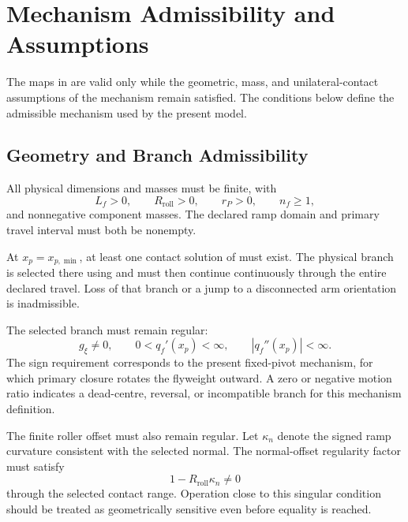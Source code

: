\documentclass[11pt]{report}
\numberwithin{equation}{section}
\newcounter{assump}
\begin{document}
\section{Mechanism Admissibility and Assumptions}
\label{app:flyweight_admissibility}

The maps in  are valid only while the geometric,
mass, and unilateral-contact assumptions of the mechanism remain satisfied.
The conditions below define the admissible mechanism used by the present model.

\subsection{Geometry and Branch Admissibility}

All physical dimensions and masses must be finite, with
\begin{equation}
    L_f>0,
    \qquad
    R_{\mathrm{roll}}>0,
    \qquad
    r_P>0,
    \qquad
    n_f\ge1,
\end{equation}
and nonnegative component masses. The declared ramp domain and primary travel
interval must both be nonempty.

At \(x_p=x_{p,\min}\), at least one contact solution of
 must exist. The physical branch is selected
there using  and must then continue
continuously through the entire declared travel. Loss of that branch or a jump
to a disconnected arm orientation is inadmissible.

The selected branch must remain regular:
\begin{equation}
    \boxed{
    g_\xi\neq0,
    \qquad
    0<q_f'(x_p)<\infty,
    \qquad
    |q_f''(x_p)|<\infty.
    }
    \label{eq:appB_q_admissible}
\end{equation}
The sign requirement corresponds to the present fixed-pivot mechanism, for
which primary closure rotates the flyweight outward. A zero or negative motion
ratio indicates a dead-centre, reversal, or incompatible branch for this
mechanism definition.

The finite roller offset must also remain regular. Let \(\kappa_n\) denote the
signed ramp curvature consistent with the selected normal. The normal-offset
regularity factor must satisfy
\begin{equation}
    \boxed{
    1-R_{\mathrm{roll}}\kappa_n\neq0
    }
    \label{eq:appB_offset_regular}
\end{equation}
through the selected contact range. Operation close to this singular condition
should be treated as geometrically sensitive even before equality is reached.
\end{document}
